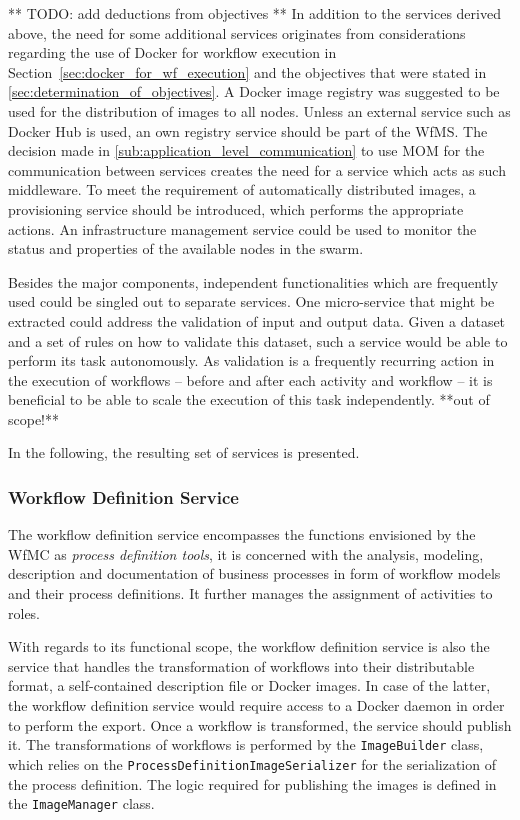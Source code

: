   ** TODO: add deductions from objectives **
  In addition to the services derived above, the need for some additional services originates from considerations regarding the use of Docker for workflow execution in Section~\ref{sec:docker_for_wf_execution} and the objectives that were stated in \ref{sec:determination_of_objectives}.
  A Docker image registry was suggested to be used for the distribution of images to all nodes. Unless an external service such as Docker Hub is used, an own registry service should be part of the \ac{WfMS}.
  The decision made in \ref{sub:application_level_communication} to use \ac{MOM} for the communication between services creates the need for a service which acts as such middleware.
  To meet the requirement of automatically distributed images, a provisioning service should be introduced, which performs the appropriate actions. An infrastructure management service could be used to monitor the status and properties of the available nodes in the swarm.

  Besides the major components, independent functionalities which are frequently used could be singled out to separate services.
  One micro-service that might be extracted could address the validation of input and output data. Given a dataset and a set of rules on how to validate this dataset, such a service would be able to perform its task autonomously. As validation is a frequently recurring action in the execution of workflows -- before and after each activity and workflow -- it is beneficial to be able to scale the execution of this task independently. **out of scope!**

  In the following, the resulting set of services is presented.

  \subsubsection{Workflow Definition Service} %
    \label{subs:workflow_definition_service}

    The workflow definition service encompasses the functions envisioned by the \ac{WfMC} as \emph{process definition tools}, \ie it is concerned with the analysis, modeling, description and documentation of business processes in form of workflow models and their process definitions. It further manages the assignment of activities to roles.

    With regards to its functional scope, the workflow definition service is also the service that handles the transformation of workflows into their distributable format, \eg a self-contained description file or Docker images. In case of the latter, the workflow definition service would require access to a Docker daemon in order to perform the export. Once a workflow is transformed, the service should publish it. The transformations of workflows is performed by the \texttt{ImageBuilder} class, which relies on the \texttt{ProcessDefinitionImageSerializer} for the serialization of the process definition. The logic required for publishing the images is defined in the \texttt{ImageManager} class.


